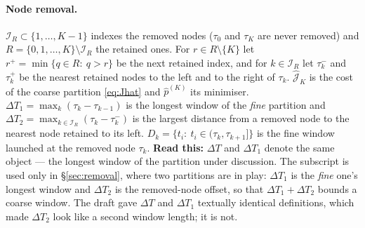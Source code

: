 \documentclass[11pt]{article}
\theoremstyle{remark}\newtheorem{remark}{Remark}
\newcommand{\hatJ}{\hat{\mathcal J}}
\newcommand{\readthis}[1]{\textbf{Read this:} #1}
\begin{document}
\paragraph{Node removal.}
$\mathcal I_R\subset\{1,\dots,K-1\}$ indexes the removed nodes ($\tau_0$ and $\tau_K$ are never removed) and $R=\{0,1,\dots,K\}\setminus\mathcal I_R$ the retained ones. For $r\in R\setminus\{K\}$ let $r^{+}=\min\{q\in R:\ q>r\}$ be the next retained index, and for $k\in\mathcal I_R$ let $\tau_k^{-}$ and $\tau_k^{+}$ be the nearest retained nodes to the left and to the right of $\tau_k$. $\hatJ_K$ is the cost of the coarse partition \eqref{eq:Jhat} and $\hat p^{(K)}$ its minimiser. $\Delta T_1=\max_k(\tau_k-\tau_{k-1})$ is the longest window of the \emph{fine} partition and $\Delta T_2=\max_{k\in\mathcal I_R}(\tau_k-\tau_k^{-})$ is the largest distance from a removed node to the nearest node retained to its left. $D_k=\{t_i:\ t_i\in(\tau_k,\tau_{k+1}]\}$ is the fine window launched at the removed node $\tau_k$.
\readthis{$\Delta T$ and $\Delta T_1$ denote the same object --- the longest window of the partition under discussion. The subscript is used only in \S\ref{sec:removal}, where two partitions are in play: $\Delta T_1$ is the \emph{fine} one's longest window and $\Delta T_2$ is the removed-node offset, so that $\Delta T_1+\Delta T_2$ bounds a coarse window. The draft gave $\Delta T$ and $\Delta T_1$ textually identical definitions, which made $\Delta T_2$ look like a second window length; it is not.}
\end{document}
